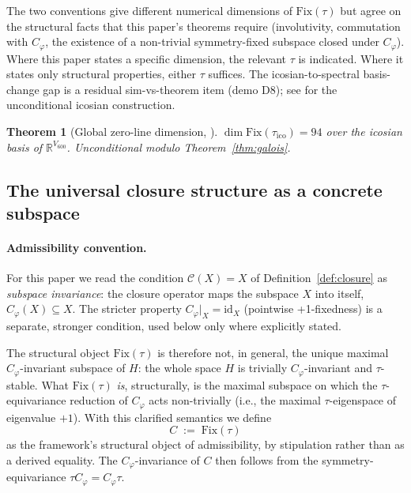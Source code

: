 \documentclass[11pt]{article}
\theoremstyle{plain}
\newtheorem{theorem}{Theorem}[section]
\theoremstyle{definition}
\theoremstyle{remark}
\newcommand{\Ccal}{\mathcal{C}}
\newcommand{\Fix}{\mathrm{Fix}}
\newcommand{\Cph}{C_\varphi}
\begin{document}
The two conventions give different numerical dimensions of $\Fix(\tau)$ but agree on the structural facts that this paper's theorems require (involutivity, commutation with $\Cph$, the existence of a non-trivial symmetry-fixed subspace closed under $\Cph$). Where this paper states a specific dimension, the relevant $\tau$ is indicated. Where it states only structural properties, either $\tau$ suffices. The icosian-to-spectral basis-change gap is a residual sim-vs-theorem item (demo D8); see \citet{PerObserverZeroLine} for the unconditional icosian construction.

\begin{theorem}[Global zero-line dimension, \citet{SmartRHTwoSphere}]\label{thm:fix-tau-94}
$\dim \Fix(\tau_{\mathrm{ico}}) = 94$ over the icosian basis of $\mathbb{R}^{V_{600}}$. Unconditional modulo Theorem~\ref{thm:galois}.
\end{theorem}

\subsection{The universal closure structure as a concrete subspace}

\paragraph{Admissibility convention.} For this paper we read the condition $\Ccal(X) = X$ of Definition~\ref{def:closure} as \emph{subspace invariance}: the closure operator maps the subspace $X$ into itself, $\Cph(X) \subseteq X$. The stricter property $\Cph|_X = \mathrm{id}_X$ (pointwise +1-fixedness) is a separate, stronger condition, used below only where explicitly stated.

The structural object $\Fix(\tau)$ is therefore not, in general, the unique maximal $\Cph$-invariant subspace of $H$: the whole space $H$ is trivially $\Cph$-invariant and $\tau$-stable. What $\Fix(\tau)$ \emph{is}, structurally, is the maximal subspace on which the $\tau$-equivariance reduction of $\Cph$ acts non-trivially (i.e., the maximal $\tau$-eigenspace of eigenvalue $+1$). With this clarified semantics we define
\begin{equation}\label{eq:c-concrete}
  \boxed{\;C \;:=\; \Fix(\tau)\;}
\end{equation}
as the framework's structural object of admissibility, by stipulation rather than as a derived equality. The $\Cph$-invariance of $C$ then follows from the symmetry-equivariance $\tau \Cph = \Cph \tau$.
\end{document}
